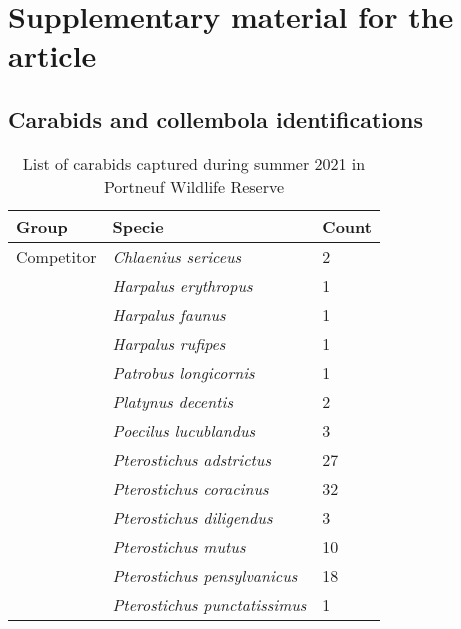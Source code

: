 \chapter{Supplementary material for the article}     %
\label{chap:supp}                   %

\pagebreak
\section{Carabids and collembola identifications}

\begin{table}[h]
    \centering
    \caption[List of carabid species captured during summer 2021 in Portneuf Wildlife Reserve and classification between salamanders competitor and prey groups.]
    {List of carabids captured during summer 2021 in Portneuf Wildlife Reserve}
    \label{tab:carabid}
    \begin{tabular}{lll} 
        \hline
        Group & Specie & Count \\ [0.5ex] 
        \hline      
        Competitor          & \textit{Chlaenius sericeus}               & 2 \\  
                            & \textit{Harpalus erythropus}              & 1 \\
                            & \textit{Harpalus faunus}                  & 1 \\
                            & \textit{Harpalus rufipes}                 & 1 \\
                            & \textit{Patrobus longicornis}             & 1 \\
                            & \textit{Platynus decentis}                & 2 \\
                            & \textit{Poecilus lucublandus}             & 3 \\
                            & \textit{Pterostichus adstrictus}          & 27 \\
                            & \textit{Pterostichus coracinus}           & 32 \\
                            & \textit{Pterostichus diligendus}          & 3 \\
                            & \textit{Pterostichus mutus}               & 10 \\
                            & \textit{Pterostichus pensylvanicus}       & 18 \\
                            & \textit{Pterostichus punctatissimus}      & 1 \\

\end{tabular}
\end{table}
